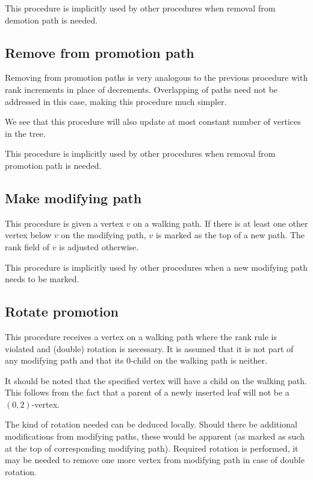 This procedure is implicitly used by other procedures when removal from demotion path is needed.


\subsection{Remove from promotion path}

Removing from promotion paths is very analogous to the previous procedure with rank increments in place of decrements. Overlapping of paths need not be addressed in this case, making this procedure much simpler.

We see that this procedure will also update at most constant number of vertices in the tree.

This procedure is implicitly used by other procedures when removal from promotion path is needed.

\subsection{Make modifying path}

This procedure is given a vertex $v$ on a walking path. If there is at least one other vertex below $v$ on the modifying path, $v$ is marked as the top of a new path. The rank field of $v$ is adjusted otherwise. 

This procedure is implicitly used by other procedures when a new modifying path needs to be marked.

\subsection{Rotate promotion}

This procedure receives a vertex on a walking path where the rank rule is violated and (double) rotation is necessary. It is assumed that it is not part of any modifying path and that its $0$-child on the walking path is neither. 

It should be noted that the specified vertex will have a child on the walking path. This follows from the fact that a parent of a newly inserted leaf will not be a $(0,2)$-vertex.

The kind of rotation needed can be deduced locally. Should there be additional modifications from modifying paths, these would be apparent (as marked as such at the top of corresponding modifying path). Required rotation is performed, it may be needed to remove one more vertex from modifying path in case of double rotation.

